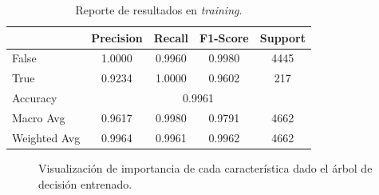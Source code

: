 \documentclass[12pt,letterpaper]{article}
\begin{document}
\begin{table}[htp]
    \centering
    \begin{tabular}{lcccc}
        \hline
        & \textbf{Precision} & \textbf{Recall} & \textbf{F1-Score} & \textbf{Support} \\ \hline
        False & 1.0000 & 0.9960 & 0.9980 & 4445 \\
        True & 0.9234 & 1.0000 & 0.9602 & 217 \\ \hline
        Accuracy & \multicolumn{4}{c}{0.9961} \\
        Macro Avg & 0.9617 & 0.9980 & 0.9791 & 4662 \\
        Weighted Avg & 0.9964 & 0.9961 & 0.9962 & 4662 \\ \hline
    \end{tabular}
    \caption{Reporte de resultados en \textit{training}.}
    \label{tab:results_decision_tree_training}
\end{table}

\begin{figure}[htp]
    \centering
    \caption{Visualización de importancia de cada característica dado el árbol de decisión entrenado.}
    \label{fig:feature_importance}
\end{figure}
\end{document}
